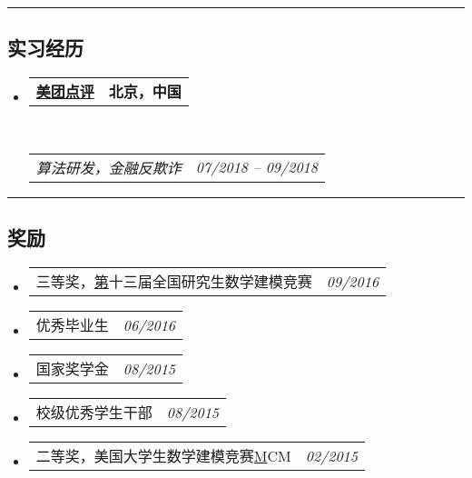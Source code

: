 \documentclass[10pt,letterpaper]{article}
\makeatletter
\newcommand{\headerrow}[2]
{\begin{tabular*}{\linewidth}{l@{\extracolsep{\fill}}r}
	#1 &
	#2 \\
\end{tabular*}}
\makeatother
\begin{document}
\hrule
\vspace{-0.4em}
\subsection*{实习经历}

\begin{itemize}
	\parskip=0.1em
	
	\item
	\headerrow
		{\textbf{\href{https://about.meituan.com/}{美团点评}}}
		{\textbf{北京，中国}}
	\\
	\headerrow
		{\emph{算法研发，金融反欺诈}}
		{\emph{07/2018 -- 09/2018}}

\end{itemize}


\hrule
\vspace{-0.4em}
\subsection*{奖励}

\begin{itemize}
	\parskip=0.1em
	
	\item 
	\headerrow
		{三等奖，\href{http://gmcm.seu.edu.cn/}第十三届全国研究生数学建模竞赛}
		{\emph{09/2016}}
	\item 
	\headerrow
		{优秀毕业生}
		{\emph{06/2016}}
	\item 
	\headerrow
		{国家奖学金}
		{\emph{08/2015}}	
	\item 
	\headerrow
		{校级优秀学生干部}
		{\emph{08/2015}}
	\item 
	\headerrow
		{二等奖，美国大学生数学建模竞赛\href{https://www.comap.com/undergraduate/contests/}MCM}
		{\emph{02/2015}}
\end{itemize}
\end{document}
